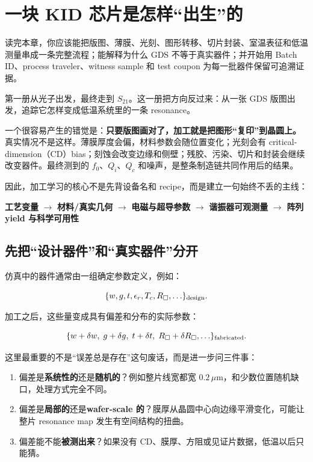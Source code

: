 \chapter{一块 KID 芯片是怎样“出生”的}

\begin{chaptergoal}
读完本章，你应该能把版图、薄膜、光刻、图形转移、切片封装、室温表征和低温测量串成一条完整流程；能解释为什么 GDS 不等于真实器件；并开始用 Batch ID、process traveler、witness sample 和 test coupon 为每一批器件保留可追溯证据。
\end{chaptergoal}

第一册从光子出发，最终走到 $S_{21}$。这一册把方向反过来：从一张 GDS 版图出发，追踪它怎样变成低温系统里的一条 resonance。

一个很容易产生的错觉是：\textbf{只要版图画对了，加工就是把图形“复印”到晶圆上。}真实情况不是这样。薄膜厚度会偏，材料参数会随位置变化；光刻会有 critical-dimension（CD）bias；刻蚀会改变边缘和侧壁；残胶、污染、切片和封装会继续改变器件。最终测到的 $f_0$、$Q_i$、$Q_c$ 和噪声，是整条制造链共同作用后的结果。

因此，加工学习的核心不是先背设备名和 recipe，而是建立一句始终不丢的主线：

\begin{processbox}
\centering
\textbf{工艺变量}
$\rightarrow$
\textbf{材料/真实几何}
$\rightarrow$
\textbf{电磁与超导参数}
$\rightarrow$
\textbf{谐振器可观测量}
$\rightarrow$
\textbf{阵列 yield 与科学可用性}
\end{processbox}

\section{先把“设计器件”和“真实器件”分开}

仿真中的器件通常由一组确定参数定义，例如：

\[
\{w,g,t,\epsilon_r,T_c,R_\square,\ldots\}_{\rm design}.
\]

加工之后，这些量变成具有偏差和分布的实际参数：

\[
\{w+\delta w,\;g+\delta g,\;t+\delta t,\;R_\square+\delta R_\square,\ldots\}_{\rm fabricated}.
\]

这里最重要的不是“误差总是存在”这句废话，而是进一步问三件事：

\begin{enumerate}
  \item 偏差是\textbf{系统性的}还是\textbf{随机的}？例如整片线宽都宽 $0.2\,\mu\mathrm{m}$，和少数位置随机缺口，处理方式完全不同。
  \item 偏差是\textbf{局部的}还是\textbf{wafer-scale 的}？膜厚从晶圆中心向边缘平滑变化，可能让整片 resonance map 发生有空间结构的扭曲。
  \item 偏差能不能\textbf{被测出来}？如果没有 CD、膜厚、方阻或见证片数据，低温以后只能猜。
\end{enumerate}

